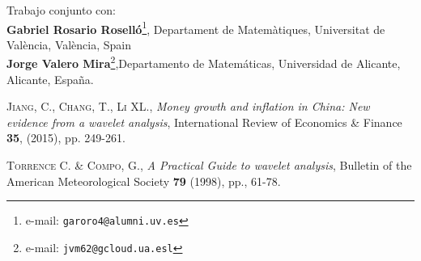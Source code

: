 \documentclass[11pt]{article}
\begin{document}
\noindent Trabajo conjunto con: \\
\textbf{Gabriel Rosario Roselló}\footnote{e-mail: \texttt{garoro4@alumni.uv.es}},
Departament de Matemàtiques, Universitat de València, València, Spain\\
\textbf{Jorge Valero Mira}\footnote{e-mail: \texttt{jvm62@gcloud.ua.esl}},Departamento de Matemáticas, Universidad de Alicante, Alicante, España.\\

\renewcommand\refname{Bibliograf\'ia}
\begin{thebibliography}{99}

\textsc{Jiang, C., Chang, T., Li XL.}, \textit{Money growth and inflation in China: New evidence from a wavelet analysis}, International Review of Economics \& Finance {\bf 35}, (2015), pp. 249-261. 

\textsc{Torrence C. \& Compo, G.}, \textit{A Practical Guide to wavelet analysis}, Bulletin of the American Meteorological Society {\bf 79}  (1998), pp., 61-78.  



\end{thebibliography}
\thispagestyle{empty}
\end{document}
